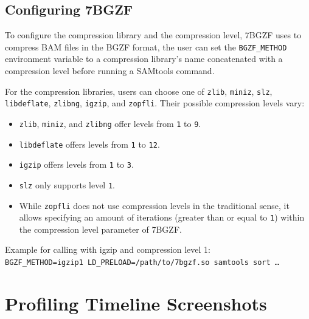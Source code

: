 \subsection{Configuring 7BGZF}\label{7bgzfConfig}

To configure the compression library and the compression level, 7BGZF uses to compress BAM files in the BGZF format, the user can set the \texttt{BGZF\_METHOD} environment variable to a compression library's name concatenated with a compression level before running a SAMtools command. 

For the compression libraries, users can choose one of {\texttt{zlib}}, {\texttt{miniz}}, {\texttt{slz}}, {\texttt{libdeflate}}, {\texttt{zlibng}}, {\texttt{igzip}}, and {\texttt{zopfli}}. Their possible compression levels vary:

\begin{itemize}
\itemsep 0mm
    \item {\texttt{zlib}}, {\texttt{miniz}}, and {\texttt{zlibng}} offer levels from \texttt{1} to \texttt{9}.
    \item {\texttt{libdeflate}} offers levels from \texttt{1} to \texttt{12}.
    \item {\texttt{igzip}} offers levels from \texttt{1} to \texttt{3}.
    \item {\texttt{slz}} only supports level \texttt{1}.
    \item While {\texttt{zopfli}} does not use compression levels in the traditional sense, it allows specifying an amount of iterations (greater than or equal to \texttt{1}) within the compression level parameter of 7BGZF.
\end{itemize}

Example for calling \sort with igzip and compression level 1: \\
\texttt{BGZF\_METHOD=igzip1 LD\_PRELOAD=/path/to/7bgzf.so samtools sort …}


\section{Profiling Timeline Screenshots}

